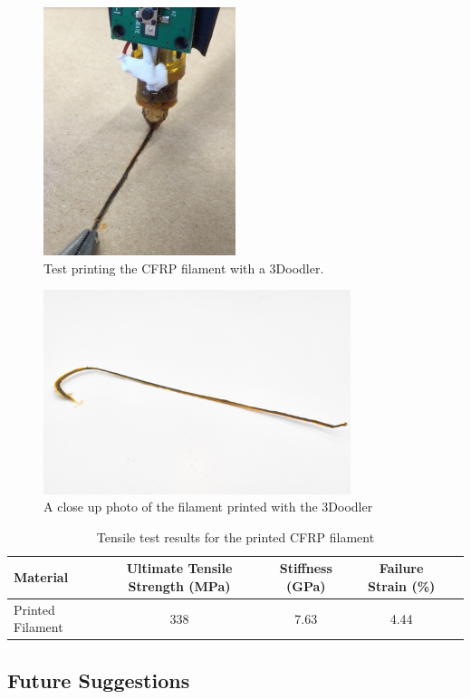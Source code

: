 \begin{figure}[htp]
    \centering
    \includegraphics[width=0.5\textwidth]{./figures/filament-print-3doodler-during}
    \caption{Test printing the CFRP filament with a 3Doodler.}
    \label{fig:filament-print-3doodler-during}
\end{figure}

\begin{figure}[htp]
    \centering
    \includegraphics[width=0.8\textwidth]{./figures/filament-extrude}
    \caption{A close up photo of the filament printed with the 3Doodler}
    \label{fig:filament-extrude}
\end{figure}

\begin{table}[h]
    \centering
    \begin{tabular}{lcccc}
        Material           & Ultimate Tensile Strength (MPa)   & Stiffness (GPa)    & Failure Strain (\%)  \\ \hline
		Printed Filament & 338 & 7.63 & 4.44
    \end{tabular}
    \caption{Tensile test results for the printed CFRP filament}
    \label{tab:printed-filament-results}
\end{table}

\subsection{Future Suggestions}